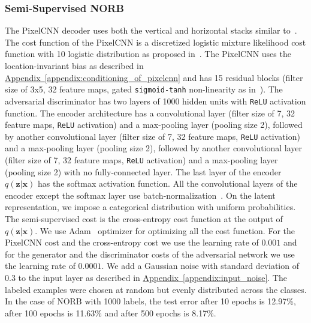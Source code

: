 \documentclass{article}
\newcommand{\myappendix}[1]{\hyperref[appendix:#1]{Appendix~\ref*{appendix:#1}}}
\begin{document}
\begin{appendices}
\subsubsection{Semi-Supervised NORB}\label{appendix:semi-norb}
The PixelCNN decoder uses both the vertical and horizontal stacks similar to~\citep{pixelcnn}. The cost function of the PixelCNN is a discretized logistic mixture likelihood cost function with 10 logistic distribution as proposed in~\citep{pixelcnn++}.
The PixelCNN uses the location-invariant bias as described in \myappendix{conditioning_of_pixelcnn} and has 15 residual blocks (filter size of 3x5, 32 feature maps, gated \texttt{sigmoid-tanh} non-linearity as in~\citep{pixelcnn}).
The adversarial discriminator has two layers of 1000 hidden units with \texttt{ReLU} activation function. 
The encoder architecture has a convolutional layer (filter size of 7, 32 feature maps, \texttt{ReLU} activation) and a max-pooling layer (pooling size 2), followed by another convolutional layer (filter size of 7, 32 feature maps, \texttt{ReLU} activation) and a max-pooling layer (pooling size 2), followed by another convolutional layer (filter size of 7, 32 feature maps, \texttt{ReLU} activation) and a max-pooling layer (pooling size 2) with no fully-connected layer. The last layer of the encoder $q(\mathbf{z}|\mathbf{x})$ has the softmax activation function. 
All the convolutional layers of the encoder except the softmax layer use batch-normalization~\citep{batch}. 
On the latent representation, we impose a categorical distribution with uniform probabilities. 
The semi-supervised cost is the cross-entropy cost function at the output of $q(\mathbf{z}|\mathbf{x})$. We use Adam~\citep{Adam} optimizer for optimizing all the cost function. 
For the PixelCNN cost and the cross-entropy cost we use the learning rate of $0.001$ and for the generator and the discriminator costs of the adversarial network we use the learning rate of $0.0001$. 
We add a Gaussian noise with standard deviation of $0.3$ to the input layer as described in \myappendix{input_noise}.
The labeled examples were chosen at random but evenly distributed across the classes. In the case of NORB with 1000 labels, the test error after 10 epochs is 12.97\%, after 100 epochs is 11.63\% and after 500 epochs is 8.17\%.

\end{appendices}
\end{document}
